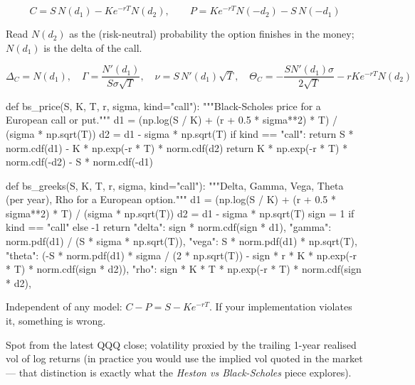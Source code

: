 \documentclass{pyportfolios-note}
\begin{document}
\[ C = S\,N(d_1) - K e^{-rT} N(d_2), \qquad
   P = K e^{-rT} N(-d_2) - S\,N(-d_1) \]

Read $N(d_2)$ as the (risk-neutral) probability the option finishes in the
money; $N(d_1)$ is the delta of the call.


\[ \Delta_C = N(d_1), \quad \Gamma = \frac{N'(d_1)}{S\sigma\sqrt{T}}, \quad
   \nu = S\,N'(d_1)\sqrt{T}, \quad
   \Theta_C = -\frac{S N'(d_1)\sigma}{2\sqrt{T}} - rKe^{-rT}N(d_2) \]

\begin{notecode}
def bs_price(S, K, T, r, sigma, kind="call"):
    """Black-Scholes price for a European call or put."""
    d1 = (np.log(S / K) + (r + 0.5 * sigma**2) * T) / (sigma * np.sqrt(T))
    d2 = d1 - sigma * np.sqrt(T)
    if kind == "call":
        return S * norm.cdf(d1) - K * np.exp(-r * T) * norm.cdf(d2)
    return K * np.exp(-r * T) * norm.cdf(-d2) - S * norm.cdf(-d1)

def bs_greeks(S, K, T, r, sigma, kind="call"):
    """Delta, Gamma, Vega, Theta (per year), Rho for a European option."""
    d1 = (np.log(S / K) + (r + 0.5 * sigma**2) * T) / (sigma * np.sqrt(T))
    d2 = d1 - sigma * np.sqrt(T)
    sign = 1 if kind == "call" else -1
    return {
        "delta": sign * norm.cdf(sign * d1),
        "gamma": norm.pdf(d1) / (S * sigma * np.sqrt(T)),
        "vega":  S * norm.pdf(d1) * np.sqrt(T),
        "theta": (-S * norm.pdf(d1) * sigma / (2 * np.sqrt(T))
                  - sign * r * K * np.exp(-r * T) * norm.cdf(sign * d2)),
        "rho":   sign * K * T * np.exp(-r * T) * norm.cdf(sign * d2),
    }
\end{notecode}


Independent of any model: $C - P = S - Ke^{-rT}$. If your implementation
violates it, something is wrong.

\noteneedroom{160bp}


Spot from the latest QQQ close; volatility proxied by the trailing 1-year
realised vol of log returns (in practice you would use the implied vol quoted in
the market — that distinction is exactly what the \textit{Heston vs
Black-Scholes} piece explores).
\end{document}
